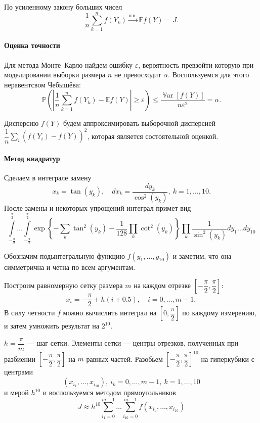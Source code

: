 \documentclass[16pt]{article}
\DeclareMathOperator*{\Var}{\mathbb{V}ar}
\newcommand\Sum[2]{\sum\limits_{#1}^{#2}}
\begin{document}
По усиленному закону больших чисел $$\dfrac1n \Sum{k=1}{n} f(Y_k) \overset{\text{п.н.}}{\rightarrow} \mathbb{E}f(Y) = J.$$

\paragraph{Оценка точности} Для метода Монте--Карло найдем ошибку $\varepsilon$, вероятность превзойти которую при моделировании выборки размера $n$ не превосходит $\alpha$. Воспользуемся для этого неравентсвом Чебышёва:
$$\mathbb{P}\left(\left|\dfrac{1}{n}\sum_{k=1}^nf(Y_k) - \mathbb{E}f(Y)\right| \geq \varepsilon \right) \leq \dfrac{\Var [f(Y)]}{n\varepsilon^2} = \alpha.$$

Дисперсию $f(Y)$ будем аппроксимировать выборочной дисперсией $\dfrac{1}{n}\sum\limits_i \left(f(Y_i) - \overline{f(Y)}\right)^2$, которая является состоятельной оценкой.

\paragraph{Метод квадратур} Сделаем в интеграле замену 
$$x_k = \tan\left(y_k\right), \quad dx_k = \dfrac{dy_k}{\cos^2\left(y_k\right)}, \ k = 1, \ldots, 10.$$
После замены и некоторых упрощений интеграл примет вид
$$\int\limits_{-\frac{\pi}{2}}^{\frac{\pi}{2}}\ldots\int\limits_{-\frac{\pi}{2}}^{\frac{\pi}{2}} \exp \left\{-\sum\limits_k \tan^2(y_k) - \dfrac{1}{128}\prod\limits_k \cot^2 (y_k)\right\}\prod\limits_k \dfrac{1}{\sin^2(y_k)}dy_1\ldots dy_{10}$$

Обозначим подынтегральную функцию $f(y_1, \ldots, y_{10})$ и заметим, что она симметрична и четна по всем аргументам.

Построим равномерную сетку размера $m$ на каждом отрезке $\left[-\dfrac{\pi}{2}, \dfrac{\pi}{2}\right]$:
$$x_i = -\frac{\pi}{2} + h(i + 0.5), \quad i = 0, \ldots, m-1,$$
В силу четности $f$ можно вычислить интеграл на $\left[0, \dfrac{\pi}2\right]$ по каждому измерению, и затем умножить результат на $2^{10}$.

$h = \dfrac{\pi}{m}$ --- шаг сетки. Элементы сетки --- центры отрезков, полученных при разбиении $\left[-\dfrac{\pi}{2}, \dfrac{\pi}{2}\right]$ на $m$ равных частей. Разобьем $\left[-\dfrac{\pi}{2}, \dfrac{\pi}{2}\right]^{10}$ на гиперкубики с центрами $$(x_{i_1}, \ldots, x_{i_{10}}),\ i_k = 0, \ldots, m-1,\ k = 1, \ldots, 10$$ и мерой $h^{10}$ и воспользуемся методом прямоугольников
$$J \approx h^{10}\sum_{i_1=0}^{m-1}\ldots\sum_{i_{10}=0}^{m-1}f(x_{i_1}, \ldots, x_{i_{10}})$$
\end{document}
